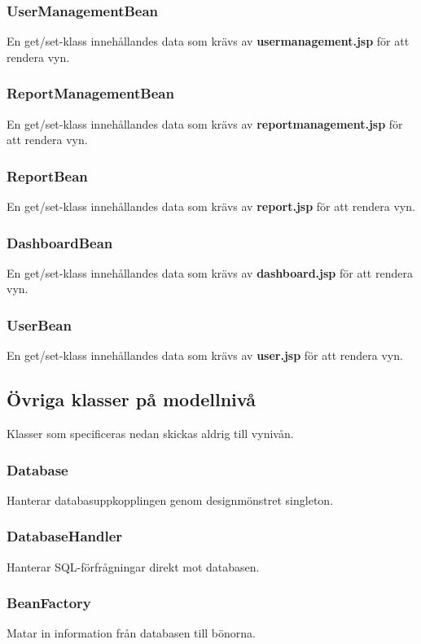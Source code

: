 \documentclass[paper=a4, fontsize=11pt,twoside]{article}
\begin{document}
\subsubsection{UserManagementBean}
En get/set-klass innehållandes data som krävs av \textbf{usermanagement.jsp} för att rendera vyn.

\subsubsection{ReportManagementBean}
En get/set-klass innehållandes data som krävs av \textbf{reportmanagement.jsp} för att rendera vyn.

\subsubsection{ReportBean}
En get/set-klass innehållandes data som krävs av \textbf{report.jsp} för att rendera vyn.

\subsubsection{DashboardBean}
En get/set-klass innehållandes data som krävs av \textbf{dashboard.jsp} för att rendera vyn.

\subsubsection{UserBean}
En get/set-klass innehållandes data som krävs av \textbf{user.jsp} för att rendera vyn.

\subsection{Övriga klasser på modellnivå}
Klasser som specificeras nedan skickas aldrig till vynivån.

\subsubsection{Database}
Hanterar databasuppkopplingen genom designmönstret singleton.

\subsubsection{DatabaseHandler}
Hanterar SQL-förfrågningar direkt mot databasen.

\subsubsection{BeanFactory}
Matar in information från databasen till bönorna.
\end{document}
